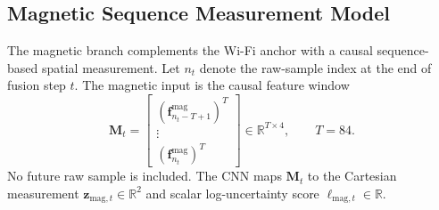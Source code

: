 \documentclass[conference]{IEEEtran}
\begin{document}
\subsection{Magnetic Sequence Measurement Model}\label{sec:mag_model}

The magnetic branch complements the Wi-Fi anchor with a causal sequence-based spatial measurement. Let $n_t$ denote the raw-sample index at the end of fusion step $t$. The magnetic input is the causal feature window
\begin{equation}
\mathbf{M}_t=
\begin{bmatrix}
(\mathbf{f}^{\mathrm{mag}}_{n_t-T+1})^T\\
\vdots\\
(\mathbf{f}^{\mathrm{mag}}_{n_t})^T
\end{bmatrix}
\in\mathbb{R}^{T\times4},\qquad T=84.
\label{eq:mag_window}
\end{equation}
No future raw sample is included. The CNN maps $\mathbf{M}_t$ to the Cartesian measurement $\mathbf{z}_{\mathrm{mag},t}\in\mathbb{R}^2$ and scalar log-uncertainty score $\ell_{\mathrm{mag},t}\in\mathbb{R}$.
\end{document}
